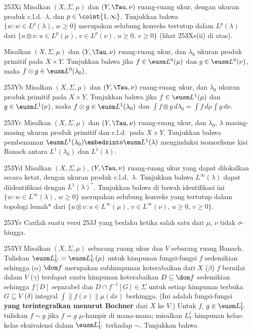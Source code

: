 {\spheader 253Xi Misalkan $(X,\Sigma,\mu)$ dan $(Y,\Tau,\nu)$ ruang-ruang
ukur, dengan ukuran produk c.l.d.\ $\lambda$, dan
$p\in\coint{1,\infty}$. Tunjukkan bahwa
$\{w:w\in L^p(\lambda),\,w\ge 0\}$ merupakan selubung konveks tertutup
dalam $L^p(\lambda)$ dari
$\{u\otimes v:u\in L^p(\mu),\,v\in L^p(\nu),\,u\ge 0,\,v\ge 0\}$
(lihat 253Xe(ii) di atas).

Misalkan $(X,\Sigma,\mu)$ dan $(Y,\Tau,\nu)$ ruang-ruang ukur, dan
$\lambda_0$ ukuran produk primitif pada $X\times Y$. Tunjukkan bahwa jika
$f\in\eusm L^0(\mu)$ dan $g\in\eusm L^0(\nu)$, maka
$f\otimes g\in\eusm L^0(\lambda_0)$.

\spheader 253Yb Misalkan $(X,\Sigma,\mu)$ dan
$(Y,\Tau,\nu)$ ruang-ruang ukur, dan $\lambda_0$ ukuran produk
primitif pada $X\times Y$. Tunjukkan bahwa jika $f\in\eusm L^1(\mu)$ dan
$g\in\eusm L^1(\nu)$, maka $f\otimes g\in\eusm L^1(\lambda_0)$ dan
$\int f\otimes g\,d\lambda_0=\int f\,d\mu\int g\,d\nu$.

\spheader 253Yc Misalkan $(X,\Sigma,\mu)$ dan $(Y,\Tau,\nu)$
ruang-ruang ukur, dan $\lambda_0$, $\lambda$ masing-masing ukuran produk
primitif dan c.l.d.\
pada $X\times Y$. Tunjukkan bahwa pembenaman
$\eusm L^1(\lambda_0)\embedsinto\eusm L^1(\lambda)$
menginduksi isomorfisme kisi Banach antara $L^1(\lambda_0)$ dan
$L^1(\lambda)$.

\spheader 253Yd Misalkan $(X,\Sigma,\mu)$, $(Y,\Tau,\nu)$ ruang-ruang
ukur yang dapat dilokalkan secara ketat, dengan ukuran produk c.l.d.\ $\lambda$.
Tunjukkan bahwa $L^{\infty}(\lambda)$ dapat diidentifikasi
dengan $L^1(\lambda)^*$. Tunjukkan bahwa di bawah identifikasi ini
$\{w:w\in L^{\infty}(\lambda),\,w\ge 0\}$ merupakan selubung konveks yang
tertutup dalam topologi lemah* dari
$\{u\otimes v:u\in L^{\infty}(\mu),\,v\in L^{\infty}(\nu),
\,u\ge 0,\,v\ge 0\}$.

\spheader 253Ye Carilah suatu versi 253J yang berlaku ketika salah satu
dari $\mu$, $\nu$ tidak $\sigma$-hingga.

\spheader 253Yf Misalkan $(X,\Sigma,\mu)$ sebarang ruang ukur dan $V$
sebarang ruang Banach. Tuliskan $\eusm L^1_V=\eusm L^1_V(\mu)$ untuk
himpunan fungsi-fungsi $f$
sedemikian sehingga ($\alpha$) $\dom f$ merupakan subhimpunan koterabaikan
dari $X$ ($\beta$) $f$ bernilai dalam $V$ ($\gamma$) terdapat suatu
himpunan koterabaikan
$D\subseteq\dom
f$ sedemikian sehingga $f[D]$ separabel dan $D\cap f^{-1}[G]\in\Sigma$
untuk setiap himpunan terbuka $G\subseteq V$ ($\delta$) integral
$\int\|f(x)\|\mu(dx)$ berhingga. (Ini adalah fungsi-fungsi {\bf yang
terintegralkan menurut Bochner} dari $X$ ke
$V$.) Untuk $f$, $g\in\eusm L^1_V$ tuliskan $f\sim g$ jika
$f=g\,\,\mu$-hampir di mana-mana; misalkan $L^1_V$ himpunan kelas-kelas
ekuivalensi dalam $\eusm L^1_V$ terhadap $\sim$. Tunjukkan bahwa

}
